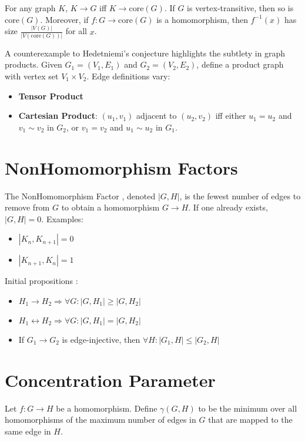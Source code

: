 \documentclass[11pt]{article}
\begin{document}
For any graph $K$, $K \rightarrow G$ iff $K \rightarrow \mathrm{core}(G)$. If $G$ is vertex-transitive, then so is $\mathrm{core}(G)$. Moreover, if $f: G \rightarrow \mathrm{core}(G)$ is a homomorphism, then $f^{-1}(x)$ has size $\frac{|V(G)|}{|V(\mathrm{core}(G))|}$ for all $x$.

A counterexample to Hedetniemi's conjecture \cite{shitov} highlights the subtlety in graph products. Given $G_1 = (V_1,E_1)$ and $G_2 = (V_2,E_2)$, define a product graph with vertex set $V_1 \times V_2$. Edge definitions vary:
\begin{itemize}
  \item \textbf{Tensor Product}
  \item \textbf{Cartesian Product}: $(u_1,v_1)$ adjacent to $(u_2,v_2)$ iff either $u_1=u_2$ and $v_1\sim v_2$ in $G_2$, or $v_1=v_2$ and $u_1\sim u_2$ in $G_1$.
\end{itemize}

\section{NonHomomorphism Factors}
The NonHomomorphism Factor \cite{kh1}, denoted $|G,H|$, is the fewest number of edges to remove from $G$ to obtain a homomorphism $G\rightarrow H$. If one already exists, $|G,H| = 0$. Examples:
\begin{itemize}
  \item $|K_n,K_{n+1}| = 0$
  \item $|K_{n+1},K_n| = 1$
\end{itemize}

Initial propositions \cite{kh1}:
\begin{itemize}
  \item $H_1 \rightarrow H_2 \Rightarrow \forall G: |G,H_1| \geq |G,H_2|$
  \item $H_1 \leftrightarrow H_2 \Rightarrow \forall G: |G,H_1| = |G,H_2|$
  \item If $G_1 \rightarrow G_2$ is edge-injective, then $\forall H: |G_1,H| \leq |G_2,H|$
\end{itemize}

\section{Concentration Parameter}
Let $f: G \rightarrow H$ be a homomorphism. Define $\gamma(G,H)$ to be the minimum over all homomorphisms of the maximum number of edges in $G$ that are mapped to the same edge in $H$.
\end{document}
